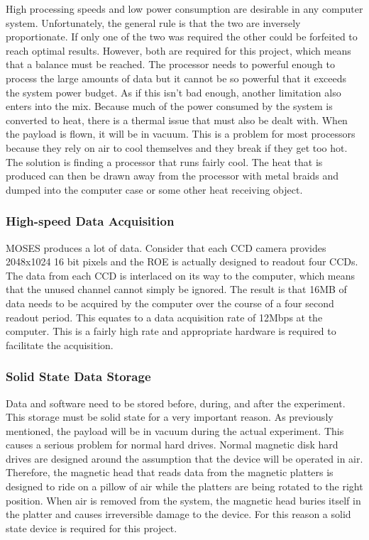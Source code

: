 \documentclass[11pt,titlepage]{article}
\begin{document}
High processing speeds and low power consumption are desirable in any computer system. Unfortunately, the general rule is that the two are
inversely proportionate. If only one of the two was required the other could be forfeited to reach optimal results. However, both are required
for this project, which means that a balance must be reached. The processor needs to powerful enough to process the large amounts of data 
but it cannot be so powerful that it exceeds the system power budget. As if this isn't bad enough, another limitation also enters into the mix.
Because much of the power consumed by the system is converted to heat, there is a thermal issue that must also be dealt with. When the payload
is flown, it will be in vacuum. This is a problem for most processors because they rely on air to cool themselves and they break if they
get too hot. The solution is finding a processor that runs fairly cool. The heat that is produced can then be drawn away from the processor
with metal braids and dumped into the computer case or some other heat receiving object.

\subsubsection{High-speed Data Acquisition}
MOSES produces a lot of data. Consider that each CCD camera provides 2048x1024 16 bit pixels and the ROE is actually designed to readout four
CCDs. The data from each CCD is interlaced on its way to the computer, which means that the unused channel cannot simply be ignored. The 
result is that 16MB of data needs to be acquired by the computer over the course of a four second readout period. This equates to a data 
acquisition rate of 12Mbps at the computer. This is a fairly high rate and appropriate hardware is required to facilitate the acquisition.

\subsubsection{Solid State Data Storage}
Data and software need to be stored before, during, and after the experiment. This storage must be solid state for a very important reason.
As previously mentioned, the payload will be in vacuum during the actual experiment. This causes a serious problem for normal hard drives. 
Normal magnetic disk hard drives are designed around the assumption that the device will be operated in air. Therefore, the magnetic head
that reads data from the magnetic platters is designed to ride on a pillow of air while the platters are being rotated to the right position.
When air is removed from the system, the magnetic head buries itself in the platter and causes irreversible damage to the device. For this
reason a solid state device is required for this project.
 
\end{document}
